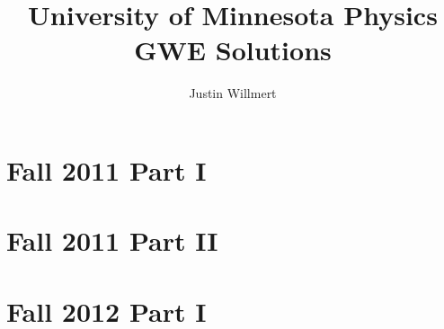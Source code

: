 \documentclass[10pt]{article}
\title{University of Minnesota Physics GWE Solutions}
\author{%
	Justin Willmert%
}
\begin{document}
\begingroup
	\small
	\makeatletter
	\let\origstarttoc\@starttoc
	\renewcommand*{\@starttoc}[1]{%
		\begin{multicols}{2}%
			\origstarttoc{#1}%
		\end{multicols}%
	}
	\makeatother
	\tableofcontents

	\printindex
	\clearpage
\endgroup

\section{Fall 2011 Part I}

\clearpage

\section{Fall 2011 Part II}

\clearpage

\section{Fall 2012 Part I}

\clearpage
\end{document}
